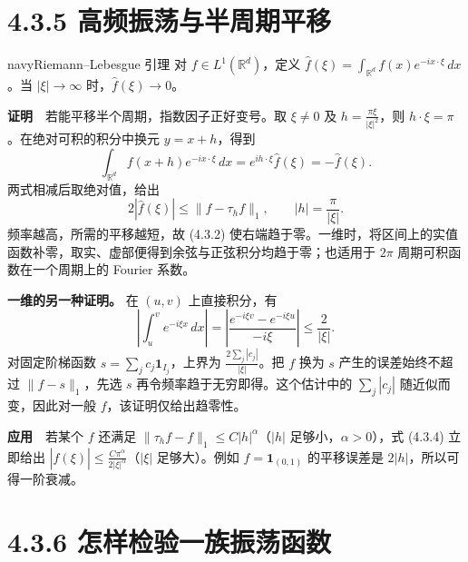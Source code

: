 \documentclass[11pt,a4paper]{article}
\begin{document}
\section[\S{}4.3.5
高频振荡与半周期平移]{4.3.5
高频振荡与半周期平移}\label{ux9ad8ux9891ux632fux8361ux4e0eux534aux5468ux671fux5e73ux79fb}

\begin{sboxenv}{navy}{Riemann--Lebesgue 引理}
对 \(f\in L^1(\mathbb R^d)\)，定义
\(\widehat f(\xi)=\int_{\mathbb R^d}f(x)e^{-i x\cdot\xi}\,dx\)。当
\(|\xi|\to\infty\) 时，\(\widehat f(\xi)\to0\)。

\end{sboxenv}

\textbf{证明}　若能平移半个周期，指数因子正好变号。取 \(\xi\ne0\) 及
\(h=\frac{\pi\xi}{|\xi|^2}\)，则
\(h\cdot\xi=\pi\)。在绝对可积的积分中换元 \(y=x+h\)，得到 \begin{equation*}
\int_{\mathbb R^d}f(x+h)e^{-ix\cdot\xi}\,dx
=e^{ih\cdot\xi}\widehat f(\xi)=-\widehat f(\xi).
\end{equation*} 两式相减后取绝对值，给出 \begin{equation*}
2|\widehat f(\xi)|\le\|f-\tau_h f\|_1,
\qquad |h|=\frac{\pi}{|\xi|}.
\tag{4.3.4}
\end{equation*} 频率越高，所需的平移越短，故 (4.3.2)
使右端趋于零。一维时，将区间上的实值函数补零，取实、虚部便得到余弦与正弦积分均趋于零；也适用于
\(2\pi\) 周期可积函数在一个周期上的 Fourier 系数。

\textbf{一维的另一种证明。} 在 \((u,v)\) 上直接积分，有 \begin{equation*}
\left|\int_u^v e^{-i\xi x}\,dx\right|
=\left|\frac{e^{-i\xi v}-e^{-i\xi u}}{-i\xi}\right|
\le\frac{2}{|\xi|}.
\end{equation*} 对固定阶梯函数 \(s=\sum_jc_j\mathbf1_{I_j}\)，上界为
\(\frac{2\sum_j|c_j|}{|\xi|}\)。把 \(f\) 换为 \(s\) 产生的误差始终不超过
\(\|f-s\|_1\)，先选 \(s\) 再令频率趋于无穷即得。这个估计中的
\(\sum_j|c_j|\) 随近似而变，因此对一般 \(f\)，该证明仅给出趋零性。

\textbf{应用}　若某个 \(f\) 还满足
\(\|\tau_h f-f\|_1\le C|h|^\alpha\)（\(|h|\) 足够小，\(\alpha>0\)），式
(4.3.4) 立即给出
\(|\widehat f(\xi)|\le \frac{C\pi^\alpha}{2|\xi|^\alpha}\)（\(|\xi|\)
足够大）。例如 \(f=\mathbf1_{(0,1)}\) 的平移误差是
\(2|h|\)，所以可得一阶衰减。

\section[\S{}4.3.6
怎样检验一族振荡函数]{4.3.6
怎样检验一族振荡函数}\label{ux600eux6837ux68c0ux9a8cux4e00ux65cfux632fux8361ux51fdux6570}
\end{document}
